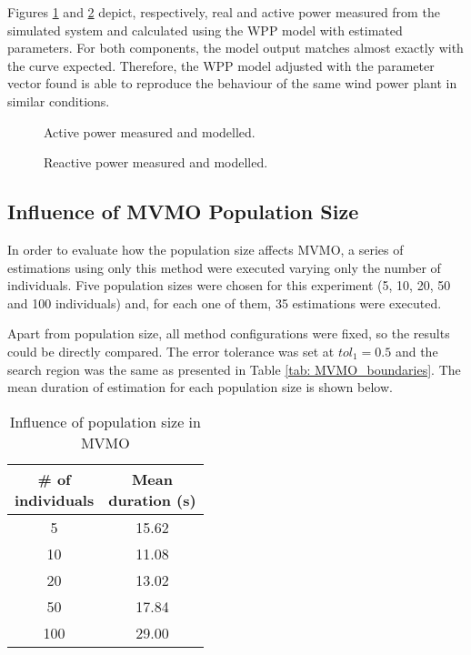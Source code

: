 Figures \ref{fig: output_P} and \ref{fig: output_Q} depict, respectively, real and active power measured from the simulated system and calculated using the WPP model with estimated parameters. For both components, the model output matches almost exactly with the curve expected. Therefore, the WPP model adjusted with the parameter vector found is able to reproduce the behaviour of the same wind power plant in similar conditions.

\begin{figure}[h]
	\begin{center}
		\caption{Active power measured and modelled.}
	\end{center}
	\label{fig: output_P}
\end{figure}

\begin{figure}[h]
	\begin{center}
		\caption{Reactive power measured and modelled.}		
	\end{center}
	\label{fig: output_Q}
\end{figure}

\subsection{Influence of MVMO Population Size}

In order to evaluate how the population size affects MVMO, a series of estimations using only this method were executed varying only the number of individuals. Five population sizes were chosen for this experiment (5, 10, 20, 50 and 100 individuals) and, for each one of them, 35 estimations were executed.

Apart from population size, all method configurations were fixed, so the results could be directly compared. The error tolerance was set at $tol_{1} = 0.5$ and the search region was the same as presented in Table \ref{tab: MVMO_boundaries}. The mean duration of estimation for each population size is shown below.

\begin{table}[h]
	\begin{center}
		\caption{Influence of population size in MVMO}
		\begin{tabular}{c|c}
			\shortstack{\# of \\ individuals} & \shortstack{Mean \\ duration (s)} \\\hline
			5 & 15.62 \\
			10 & 11.08 \\
			20 & 13.02 \\
			50 & 17.84 \\
			100 & 29.00 
		\end{tabular}
	\end{center}
	\label{tab: pop_size}
\end{table}

